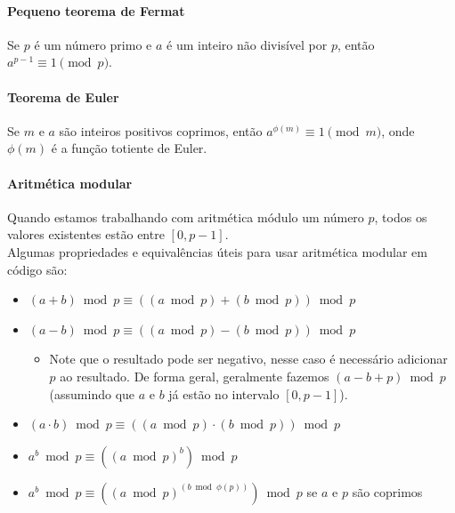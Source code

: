 \paragraph{Pequeno teorema de Fermat}

Se $p$ é um número primo e $a$ é um inteiro não divisível por $p$, então $a^{p-1} \equiv 1 \pmod p$.

\paragraph{Teorema de Euler}

Se $m$ e $a$ são inteiros positivos coprimos, então $a^{\phi(m)} \equiv 1 \pmod m$, onde $\phi(m)$ é a função totiente de Euler.

\paragraph{Aritmética modular}

Quando estamos trabalhando com aritmética módulo um número $p$, todos os valores existentes estão entre $[0, p-1]$.\\
Algumas propriedades e equivalências úteis para usar aritmética modular em código são:
\begin{itemize}\setlength\itemsep{0pt}
    \item $(a + b) \bmod p \equiv ((a \bmod p) + (b \bmod p)) \bmod p$
    \item $(a - b) \bmod p \equiv ((a \bmod p) - (b \bmod p)) \bmod p$
    \begin{itemize}\setlength\itemsep{0pt}
        \item Note que o resultado pode ser negativo, nesse caso é necessário adicionar $p$ ao resultado. De forma geral, geralmente fazemos $(a - b + p) \bmod p$ (assumindo que $a$ e $b$ já estão no intervalo $[0, p-1]$).
    \end{itemize}
    \item $(a \cdot b) \bmod p \equiv ((a \bmod p) \cdot (b \bmod p)) \bmod p$
    \item $a^b \bmod p \equiv ((a \bmod p)^b) \bmod p$
    \item $a^b \bmod p \equiv ((a \bmod p)^{(b \bmod \phi(p))}) \bmod p$ se $a$ e $p$ são coprimos
\end{itemize}